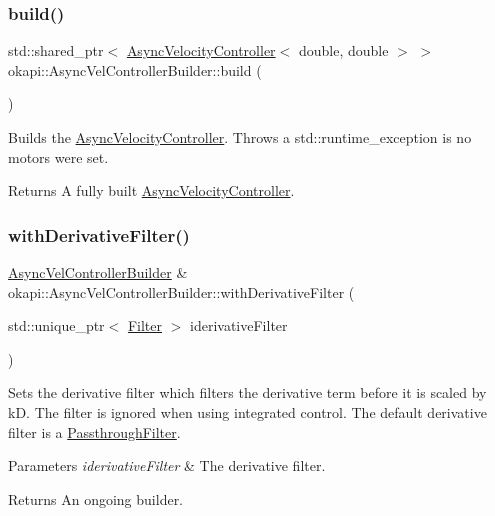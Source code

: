 \subsubsection{\texorpdfstring{build()}{build()}}
{\footnotesize\ttfamily std\+::shared\+\_\+ptr$<$ \mbox{\hyperlink{classokapi_1_1AsyncVelocityController}{Async\+Velocity\+Controller}}$<$ double, double $>$ $>$ okapi\+::\+Async\+Vel\+Controller\+Builder\+::build (\begin{DoxyParamCaption}{ }\end{DoxyParamCaption})}

Builds the \mbox{\hyperlink{classokapi_1_1AsyncVelocityController}{Async\+Velocity\+Controller}}. Throws a std\+::runtime\+\_\+exception is no motors were set.

\begin{DoxyReturn}{Returns}
A fully built \mbox{\hyperlink{classokapi_1_1AsyncVelocityController}{Async\+Velocity\+Controller}}. 
\end{DoxyReturn}
\mbox{\label{classokapi_1_1AsyncVelControllerBuilder_ae3d54b49f57ed29410013d112f6141cc}} 
\subsubsection{\texorpdfstring{withDerivativeFilter()}{withDerivativeFilter()}}
{\footnotesize\ttfamily \mbox{\hyperlink{classokapi_1_1AsyncVelControllerBuilder}{Async\+Vel\+Controller\+Builder}} \& okapi\+::\+Async\+Vel\+Controller\+Builder\+::with\+Derivative\+Filter (\begin{DoxyParamCaption}\item[{std\+::unique\+\_\+ptr$<$ \mbox{\hyperlink{classokapi_1_1Filter}{Filter}} $>$}]{iderivative\+Filter }\end{DoxyParamCaption})}

Sets the derivative filter which filters the derivative term before it is scaled by kD. The filter is ignored when using integrated control. The default derivative filter is a \mbox{\hyperlink{classokapi_1_1PassthroughFilter}{Passthrough\+Filter}}.


\begin{DoxyParams}{Parameters}
{\em iderivative\+Filter} & The derivative filter. \\
\hline
\end{DoxyParams}
\begin{DoxyReturn}{Returns}
An ongoing builder. 
\end{DoxyReturn}
\mbox{\label{classokapi_1_1AsyncVelControllerBuilder_af919e427baf0c06790895f5cb9ce333d}} 
